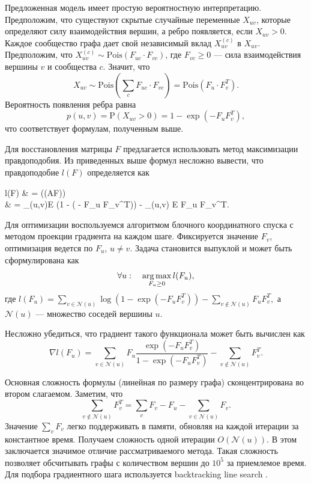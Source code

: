 \documentclass{ITaSconf}
\newcommand{\argmax}{\mathop{\rm arg\,max}\limits}
\def\PP{\mathrm{P}}
\begin{document}
	Предложенная модель имеет простую вероятностную интерпретацию. 
	Предположим, что существуют скрытые случайные переменные $X_{uv}$, которые определяют силу взаимодействия вершин, а ребро появляется, если $X_{uv} > 0$.
	Каждое сообщество графа дает свой независимый вклад $X_{uv}^{(c)}$ в $X_{uv}$.
	Предположим, что $X_{uv}^{(c)} \sim \mathrm{Pois}(F_{uc} \cdot F_{vc})$, где $F_{vc}\ge 0$ --- сила взаимодействия вершины $v$ и сообщества $c$. 
	Значит, что 
	$$X_{uv} \sim \mathrm{Pois}(\sum_{c} F_{uc} \cdot F_{vc}) = \mathrm{Pois}(F_{u} \cdot F_{v}^T).$$
	Вероятность появления ребра равна 
	$$p(u,v) = \PP(X_{uv} > 0) = 1 - \exp( - F_{u} F_{v}^T),$$
	что соответствует формулам, полученным выше.
	
	Для восстановления матрицы $F$ предлагается использовать метод максимизации правдоподобия.
	Из приведенных выше формул несложно вывести, что правдоподобие $l(F)$ определяется как
	\begin{flalign*}
	l(F) & = \log(\PP(A\mid F)) \\
	& = \sum_{(u,v)\in E} \log(1 - \exp( - F_{u} F_{v}^T)) - \sum_{(u,v) \notin E} F_u F_v^T.
	\end{flalign*}
	
	Для оптимизации воспользуемся алгоритмом блочного координатного спуска с методом проекции градиента на каждом шаге.
	Фиксируется значение $F_v$, оптимизация ведется по $F_u$, $u \ne v$. Задача становится выпуклой и может быть сформулирована как
	$$\forall u: \quad \argmax_{F_u \ge 0} l(F_u), $$
	где 
	$\displaystyle l(F_u) = \sum_{v \in \mathcal{N}(u)} \log(1-\exp(-F_u F_v^T)) - \sum_{v \notin \mathcal{N}(u)} F_u F_v^T, $
	а $\mathcal{N}(u)$ — множество соседей вершины $u$.
	
	Несложно убедиться, что градиент такого функционала может быть вычислен как
	$$\nabla l(F_u) = \sum_{v \in \mathcal{N}(u)} F_u \dfrac{\exp(-F_u F_v^T)}{1-\exp(-F_u F_v^T)} - \sum_{v \notin \mathcal{N}(u)} F_v^T. $$
	
	Основная сложность формулы (линейная по размеру графа) сконцентрирована во втором слагаемом. Заметим, что 
	$$\sum_{v \notin \mathcal{N}(u)} F_v^T = \sum_v{F_v} - F_u - \sum_{v\in \mathcal{N}(u)} F_v.$$ 
	Значение $\sum_v{F_v}$ легко поддерживать в памяти, обновляя на каждой итерации за константное время. Получаем сложность одной итерации $O(\mathcal{N}(u))$. 
	В этом заключается значимое отличие рассматриваемого метода. 
	Такая сложность позволяет обсчитывать графы с количеством вершин до $10^5$ за приемлемое время.
	Для подбора градиентного шага используется backtracking line search \cite{boyd2004convex}.
	
\end{document}
